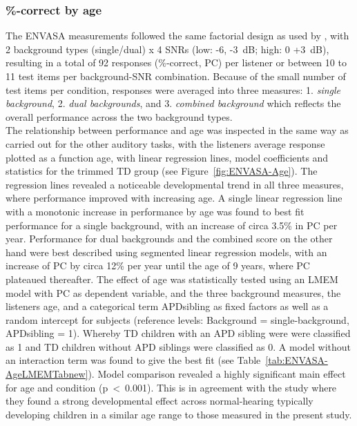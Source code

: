 \documentclass[a4paper, twoside]{templates/ociamthesis}
\begin{document}
\hypertarget{correct-by-age}{%
\subsubsection*{\%-correct by age}\label{correct-by-age}}

The ENVASA measurements followed the same factorial design as used by \textcite{Leech2009}, with 2 background types (single/dual) x 4 SNRs (low: -6, -3~dB; high: 0 +3~dB), resulting in a total of 92 responses (\%-correct, PC) per listener or between 10 to 11 test items per background-SNR combination. Because of the small number of test items per condition, responses were averaged into three measures: 1. \emph{single background}, 2. \emph{dual backgrounds}, and 3. \emph{combined background} which reflects the overall performance across the two background types.\\

The relationship between performance and age was inspected in the same way as carried out for the other auditory tasks, with the listeners average response plotted as a function age, with linear regression lines, model coefficients and statistics for the trimmed TD group (see Figure~\ref{fig:ENVASA-Age}). The regression lines revealed a noticeable developmental trend in all three measures, where performance improved with increasing age. A single linear regression line with a monotonic increase in performance by age was found to best fit performance for a single background, with an increase of circa 3.5\% in PC per year. Performance for dual backgrounds and the combined score on the other hand were best described using segmented linear regression models, with an increase of PC by circa 12\% per year until the age of 9 years, where PC plateaued thereafter. The effect of age was statistically tested using an LMEM model with PC as dependent variable, and the three background measures, the listeners age, and a categorical term APDsibling as fixed factors as well as a random intercept for subjects (reference levels: Background = single-background, APDsibling = 1).
Whereby TD children with an APD sibling were were classified as 1 and TD children without APD siblings were classified as 0. A model without an interaction term was found to give the best fit (see Table~\ref{tab:ENVASA-AgeLMEMTabnew}). Model comparison revealed a highly significant main effect for age and condition (p~\textless~0.001). This is in agreement with the \textcite{Krishnan2013} study where they found a strong developmental effect across normal-hearing typically developing children in a similar age range to those measured in the present study.
\end{document}
